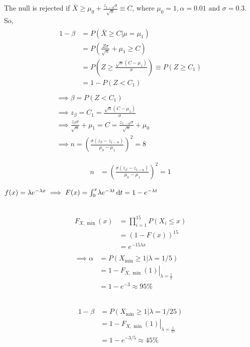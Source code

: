 \documentclass[twocolumn]{article}
\begin{document}
The null is rejected if  $\bar X \ge \mu_0+\frac{z_{1-\alpha}\sigma}{\sqrt{n}}\equiv C$, where $\mu_0=1,\alpha=0.01\text{ and } \sigma=0.3$. So,
\begin{gather*}
\begin{aligned}
1-\beta&=P(\bar X\ge C|\mu=\mu_1)\\
&=P\left(\frac{Z\sigma}{\sqrt{n}}+\mu_1\ge C\right)\\
&=P\left(Z\ge\frac{\sqrt{n}(C-\mu_1)}{\sigma}\right)\equiv P(Z\ge C_1)\\
&=1-P(Z<C_1)\\
\end{aligned}\\
\implies \beta =P(Z<C_1)\\
\implies z_\beta=C_1=\frac{\sqrt{n}(C-\mu_1)}{\sigma}\\
\implies \frac{z_\beta \sigma}{\sqrt{n}}+\mu_1=C=\frac{z_{1-\alpha}\sigma}{\sqrt{n}}+\mu_0\\
\implies n=\left(
	\frac{\sigma(z_\beta-z_{1-\alpha})}{\mu_0-\mu_1}
\right)^2=8
\end{gather*}


\begin{align*}
n&=\left(
	\frac{\sigma(z_\beta-z_{1-\alpha})}{\mu_0-\mu_1}
\right)^2=1
\end{align*}


$f(x)=\lambda e^{-\lambda x}\implies F(x)=\int_{0}^{x} \! \lambda e^{-\lambda t} \, \mathrm{d} t=1-e^{-\lambda t}$
\subsection{}
\begin{gather*}
\begin{aligned}
F_{X,\min}(x)&=\prod_{i=1}^{15} P(X_i\le x)\\
&=(1-F(x))^{15}\\
&=e^{-15\lambda x}
\end{aligned}\\
\begin{aligned}
\implies \alpha &=P(X_{\min}\ge 1|\lambda=1/5)\\
&=1-\left.F_{X,\min}(1)\right|_{\lambda=\frac{1}{5}}\\
&=1-e^{-3}\approx 95\%
\end{aligned}
\end{gather*}

\subsection{}
\begin{align*}
1-\beta&=P(X_{\min} \ge 1|\lambda=1/25)\\
&=1-\left.F_{X,\min}(1)\right|_{\lambda=\frac{1}{25}}\\
&=1-e^{-3/5}\approx 45\%
\end{align*}
\end{document}
